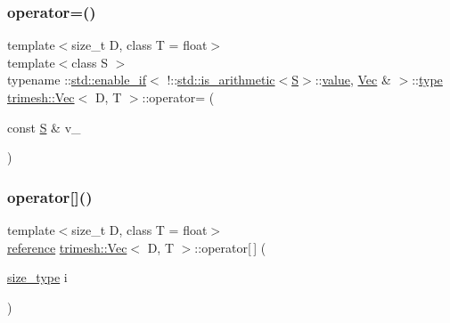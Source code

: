 \subsubsection{\texorpdfstring{operator=()}{operator=()}\hspace{0.1cm}{\footnotesize\ttfamily [2/2]}}
{\footnotesize\ttfamily template$<$size\+\_\+t D, class T = float$>$ \\
template$<$class S $>$ \\
typename \+::\hyperlink{structstd_1_1enable__if}{std\+::enable\+\_\+if}$<$ !\+::\hyperlink{structstd_1_1is__arithmetic}{std\+::is\+\_\+arithmetic}$<$\hyperlink{ego_8cc_abde73cd36321648268fb4543509b996a}{S}$>$\+::\hyperlink{namespacetrimesh_ab10cc1052c9d1d1376d92211b6ca27dd}{value}, \hyperlink{classtrimesh_1_1Vec}{Vec} \& $>$\+::\hyperlink{namespacetrimesh_aa726c5bf9cff74a26269e8d258ae9e3d}{type} \hyperlink{classtrimesh_1_1Vec}{trimesh\+::\+Vec}$<$ D, T $>$\+::operator= (\begin{DoxyParamCaption}\item[{const \hyperlink{ego_8cc_abde73cd36321648268fb4543509b996a}{S} \&}]{v\+\_\+ }\end{DoxyParamCaption})\hspace{0.3cm}{\ttfamily [inline]}}

\mbox{\label{classtrimesh_1_1Vec_a95341351872775023d0166bcd3ae9cf0}} 
\subsubsection{\texorpdfstring{operator[]()}{operator[]()}\hspace{0.1cm}{\footnotesize\ttfamily [1/4]}}
{\footnotesize\ttfamily template$<$size\+\_\+t D, class T = float$>$ \\
\hyperlink{classtrimesh_1_1Vec_ad76bb92c986524d251998d6eae7d2825}{reference} \hyperlink{classtrimesh_1_1Vec}{trimesh\+::\+Vec}$<$ D, T $>$\+::operator\mbox{[}$\,$\mbox{]} (\begin{DoxyParamCaption}\item[{\hyperlink{classtrimesh_1_1Vec_a65397e05ed96e7723cf2d54dfff0ad0a}{size\+\_\+type}}]{i }\end{DoxyParamCaption})\hspace{0.3cm}{\ttfamily [inline]}}

\mbox{\label{classtrimesh_1_1Vec_a790a163133b5e88649149111efac8a4e}} 
